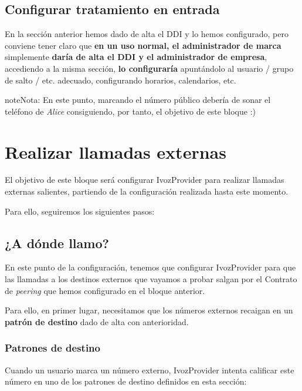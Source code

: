 \documentclass[letterpaper,10pt,spanish]{sphinxmanual}
\begin{document}
\section{Configurar tratamiento en entrada}
\label{external_incoming_calls/configure_ddi:configurar-tratamiento-en-entrada}
En la sección anterior hemos dado de alta el DDI y lo hemos configurado, pero conviene tener claro que \textbf{en un uso normal, el administrador de marca} simplemente \textbf{daría de alta el DDI y el administrador de empresa}, accediendo a la misma sección, \textbf{lo configuraría} apuntándolo al usuario / grupo de salto / etc. adecuado, configurando horarios, calendarios, etc.

\begin{notice}{note}{Nota:}
En este punto, marcando el número público debería de sonar el teléfono de \emph{Alice} consiguiendo, por tanto, el objetivo de este bloque :)
\end{notice}


\chapter{Realizar llamadas externas}
\label{external_outgoing_calls/index:realizar-llamadas-externas}\label{external_outgoing_calls/index::doc}
El objetivo de este bloque será configurar IvozProvider para realizar llamadas externas salientes, partiendo de la configuración realizada hasta este momento.

Para ello, seguiremos los siguientes pasos:


\section{¿A dónde llamo?}
\label{external_outgoing_calls/call_types::doc}\label{external_outgoing_calls/call_types:a-donde-llamo}
En este punto de la configuración, tenemos que configurar IvozProvider para que las llamadas a los destinos externos que vayamos a probar salgan por el Contrato de \emph{peering} que hemos configurado en el bloque anterior.

Para ello, en primer lugar, necesitamos que los números externos recaigan en un \textbf{patrón de destino} dado de alta con anterioridad.


\subsection{Patrones de destino}
\label{external_outgoing_calls/call_types:target-patterns}\label{external_outgoing_calls/call_types:patrones-de-destino}
Cuando un usuario marca un número externo, IvozProvider intenta calificar este número en uno de los patrones de destino definidos en esta sección:
\end{document}
